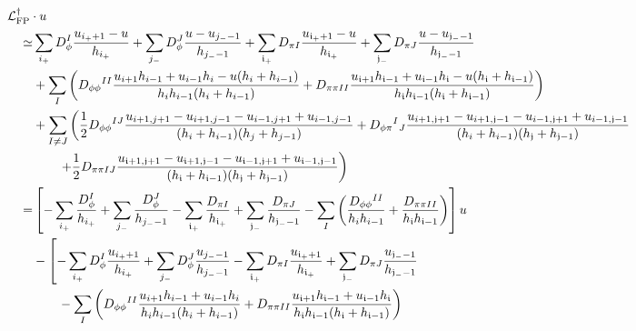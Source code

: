 \documentclass[aps, prd
, preprint
, nofootinbib 
, longbibliography
]{revtex4-1}
\newcommand{\FP}{\text{FP}}
\newcommand{\calL}{\mathcal{L}}
\newcommand{\bae}[1]{\begin{align} #1 \end{align}}
\begin{document}
\bae{
	&\hspace{-20pt}\calL_\FP^\dagger\cdot u \nonumber \\
	\simeq&\sum_{i_+}D_\phi^I\frac{u_{i_++1}-u}{h_{i_+}}+\sum_{j_-}D_\phi^J\frac{u-u_{j_--1}}{h_{j_--1}}
	+\sum_{\mathfrak{i}_+}D_{\pi I}\frac{u_{\mathfrak{i}_++1}-u}{h_{\mathfrak{i}_+}}
	+\sum_{\mathfrak{j}_-}D_{\pi J}\frac{u-u_{\mathfrak{j}_--1}}{h_{\mathfrak{j}_--1}} \nonumber \\
	&+\sum_I\left(D_{\phi\phi}{}^{II}\frac{u_{i+1}h_{i-1}+u_{i-1}h_i-u(h_i+h_{i-1})}{h_ih_{i-1}(h_i+h_{i-1})}
	+D_{\pi\pi II}\frac{u_{\mathfrak{i}+1}h_{\mathfrak{i}-1}+u_{\mathfrak{i}-1}h_\mathfrak{i}-u(h_\mathfrak{i}+h_{\mathfrak{i}-1})}
	{h_\mathfrak{i}h_{\mathfrak{i}-1}(h_\mathfrak{i}+h_{\mathfrak{i}-1})}\right) \nonumber \\
	&+\sum_{I\neq J}\left(\frac{1}{2}D_{\phi\phi}{}^{IJ}\frac{u_{i+1,j+1}-u_{i+1,j-1}-u_{i-1,j+1}+u_{i-1,j-1}}{(h_i+h_{i-1})(h_j+h_{j-1})}
	+D_{\phi\pi}{}^I{}_J\frac{u_{i+1,\mathfrak{j}+1}-u_{i+1,\mathfrak{j}-1}-u_{i-1,\mathfrak{j}+1}+u_{i-1,\mathfrak{j}-1}}{(h_i+h_{i-1})(h_\mathfrak{j}+h_{\mathfrak{j}-1})}
	\right.\nonumber \\
	&\hspace{20pt}\left.+\frac{1}{2}D_{\pi\pi IJ}
	\frac{u_{\mathfrak{i}+1,\mathfrak{j}+1}-u_{\mathfrak{i}+1,\mathfrak{j}-1}-u_{\mathfrak{i}-1,\mathfrak{j}+1}+u_{\mathfrak{i}-1,\mathfrak{j}-1}}
	{(h_\mathfrak{i}+h_{\mathfrak{i}-1})(h_\mathfrak{j}+h_{\mathfrak{j}-1})}\right) \nonumber \\
	=&\left[-\sum_{i_+}\frac{D_\phi^I}{h_{i_+}}+\sum_{j_-}\frac{D_\phi^J}{h_{j_--1}}
	-\sum_{\mathfrak{i}_+}\frac{D_{\pi I}}{h_{\mathfrak{i}_+}}+\sum_{\mathfrak{j}_-}\frac{D_{\pi J}}{h_{\mathfrak{j}_--1}}
	-\sum_I\left(\frac{D_{\phi\phi}{}^{II}}{h_ih_{i-1}}+\frac{D_{\pi\pi II}}{h_\mathfrak{i}h_{\mathfrak{i}-1}}\right)\right]u \nonumber \\
	&-\left[-\sum_{i_+}D_\phi^I\frac{u_{i_++1}}{h_{i_+}}+\sum_{j_-}D_\phi^J\frac{u_{j_--1}}{h_{j_--1}}
	-\sum_{\mathfrak{i}_+}D_{\pi I}\frac{u_{\mathfrak{i}_++1}}{h_{\mathfrak{i}_+}}
	+\sum_{\mathfrak{j}_-}D_{\pi J}\frac{u_{\mathfrak{j}_--1}}{h_{\mathfrak{j}_--1}} \right. \nonumber \\
	&\hspace{20pt}-\sum_I\left(D_{\phi\phi}{}^{II}\frac{u_{i+1}h_{i-1}+u_{i-1}h_i}{h_ih_{i-1}(h_i+h_{i-1})}
	+D_{\pi\pi II}\frac{u_{\mathfrak{i}+1}h_{\mathfrak{i}-1}+u_{\mathfrak{i}-1}h_\mathfrak{i}}
	{h_\mathfrak{i}h_{\mathfrak{i}-1}(h_\mathfrak{i}+h_{\mathfrak{i}-1})}\right) \nonumber \\
}
\end{document}

